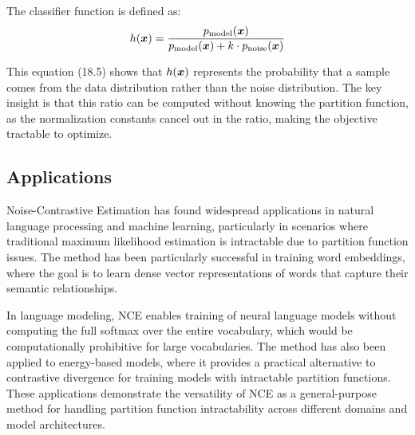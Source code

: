 The classifier function is defined as:
\begin{equation}
h(\boldsymbol{x}) = \frac{p_{\text{model}}(\boldsymbol{x})}{p_{\text{model}}(\boldsymbol{x}) + k \cdot p_{\text{noise}}(\boldsymbol{x})}
\end{equation}

This equation (18.5) shows that $h(\boldsymbol{x})$ represents the probability that a sample comes from the data distribution rather than the noise distribution. The key insight is that this ratio can be computed without knowing the partition function, as the normalization constants cancel out in the ratio, making the objective tractable to optimize.

\subsection{Applications}

Noise-Contrastive Estimation has found widespread applications in natural language processing and machine learning, particularly in scenarios where traditional maximum likelihood estimation is intractable due to partition function issues. The method has been particularly successful in training word embeddings, where the goal is to learn dense vector representations of words that capture their semantic relationships.

In language modeling, NCE enables training of neural language models without computing the full softmax over the entire vocabulary, which would be computationally prohibitive for large vocabularies. The method has also been applied to energy-based models, where it provides a practical alternative to contrastive divergence for training models with intractable partition functions. These applications demonstrate the versatility of NCE as a general-purpose method for handling partition function intractability across different domains and model architectures.



